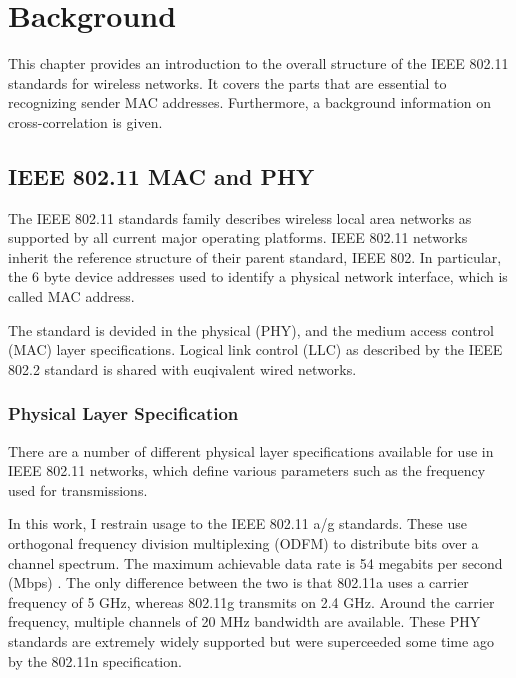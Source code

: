 
\chapter{Background}\label{ch:relatedwork}
\glsresetall %

This chapter provides an introduction to the overall structure of the IEEE 802.11 standards for wireless networks. It covers the parts that are essential to recognizing sender MAC addresses. Furthermore, a background information on cross-correlation is given.



\section{IEEE 802.11 MAC and PHY}

The IEEE 802.11 standards family describes wireless local area networks as supported by all current major operating platforms. IEEE 802.11 networks inherit the reference structure of their parent standard, IEEE 802. In particular, the 6 byte device addresses used to identify a physical network interface, which is called MAC address.

The standard is devided in the physical (PHY), and the medium access control (MAC) layer specifications. Logical link control (LLC) as described by the IEEE 802.2 standard is shared with euqivalent wired networks.


\subsection{Physical Layer Specification}

There are a number of different physical layer specifications available for use in IEEE 802.11 networks, which define various parameters such as the frequency used for transmissions.

In this work, I restrain usage to the IEEE 802.11 a/g standards. These use orthogonal frequency division multiplexing (ODFM) to distribute bits over a channel spectrum. The maximum achievable data rate is 54 megabits per second (Mbps) \cite{ieee2012}. The only difference between the two is that 802.11a uses a carrier frequency of 5 GHz, whereas 802.11g transmits on 2.4 GHz. Around the carrier frequency, multiple channels of 20 MHz bandwidth are available. These PHY standards are extremely widely supported but were superceeded some time ago by the 802.11n specification.

